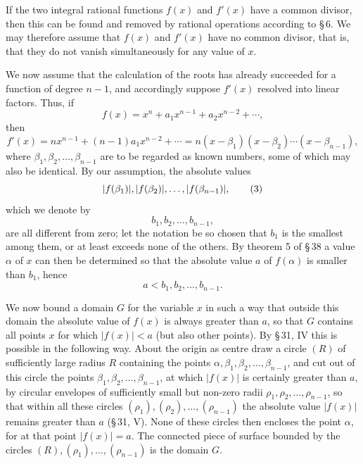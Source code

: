 \documentclass[11pt]{article}
\begin{document}
If the two integral rational functions $f(x)$ and $f'(x)$ have a common divisor, then this can be found and removed by rational operations according to \S\,6. We may therefore assume that $f(x)$ and $f'(x)$ have no common divisor, that is, that they do not vanish simultaneously for any value of $x$.

We now assume that the calculation of the roots has already succeeded for a function of degree $n-1$, and accordingly suppose $f'(x)$ resolved into linear factors. Thus, if
\begin{equation}
 f(x)=x^n+a_1x^{n-1}+a_2x^{n-2}+\cdots,
\tag{1}
\end{equation}
then
\begin{equation}
 f'(x)=nx^{n-1}+(n-1)a_1x^{n-2}+\cdots
      =n(x-\beta_1)(x-\beta_2)\cdots(x-\beta_{n-1}),
\tag{2}
\end{equation}
where $\beta_1,\beta_2,\ldots,\beta_{n-1}$ are to be regarded as known numbers, some of which may also be identical. By our assumption, the absolute values
\begin{equation}
 |f(\beta_1)|,\\ |f(\beta_2)|,\ldots, |f(\beta_{n-1})|,
\tag{3}
\end{equation}
which we denote by
\begin{equation}
 b_1,b_2,\ldots,b_{n-1},
\tag{4}
\end{equation}
are all different from zero; let the notation be so chosen that $b_1$ is the smallest among them, or at least exceeds none of the others. By theorem 5 of \S\,38 a value $\alpha$ of $x$ can then be determined so that the absolute value $a$ of $f(\alpha)$ is smaller than $b_1$, hence
\begin{equation}
 a<b_1,b_2,\ldots,b_{n-1}.
\tag{5}
\end{equation}

We now bound a domain $G$ for the variable $x$ in such a way that outside this domain the absolute value of $f(x)$ is always greater than $a$, so that $G$ contains all points $x$ for which $|f(x)|<a$ (but also other points). By \S\,31, IV this is possible in the following way. About the origin as centre draw a circle $(R)$ of sufficiently large radius $R$ containing the points $\alpha,\beta_1,\beta_2,
\ldots,\beta_{n-1}$, and cut out of this circle the points $\beta_1,\beta_2,
\ldots,\beta_{n-1}$, at which $|f(x)|$ is certainly greater than $a$, by circular envelopes of sufficiently small but non-zero radii $\rho_1,\rho_2,
\ldots,\rho_{n-1}$, so that within all these circles $(\rho_1),(\rho_2),\ldots,(\rho_{n-1})$ the absolute value $|f(x)|$ remains greater than $a$ (\S\,31, V). None of these circles then encloses the point $\alpha$, for at that point $|f(x)|=a$. The connected piece of surface bounded by the circles $(R),(\rho_1),\ldots,(\rho_{n-1})$ is the domain $G$.
\end{document}
